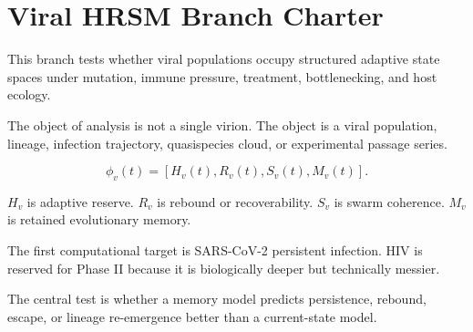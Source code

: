 \section*{Viral HRSM Branch Charter}

This branch tests whether viral populations occupy structured adaptive state spaces under mutation, immune pressure, treatment, bottlenecking, and host ecology.

The object of analysis is not a single virion. The object is a viral population, lineage, infection trajectory, quasispecies cloud, or experimental passage series.

\[
\phi_v(t) = [H_v(t), R_v(t), S_v(t), M_v(t)].
\]

\(H_v\) is adaptive reserve.
\(R_v\) is rebound or recoverability.
\(S_v\) is swarm coherence.
\(M_v\) is retained evolutionary memory.

The first computational target is SARS-CoV-2 persistent infection. HIV is reserved for Phase II because it is biologically deeper but technically messier.

The central test is whether a memory model predicts persistence, rebound, escape, or lineage re-emergence better than a current-state model.
